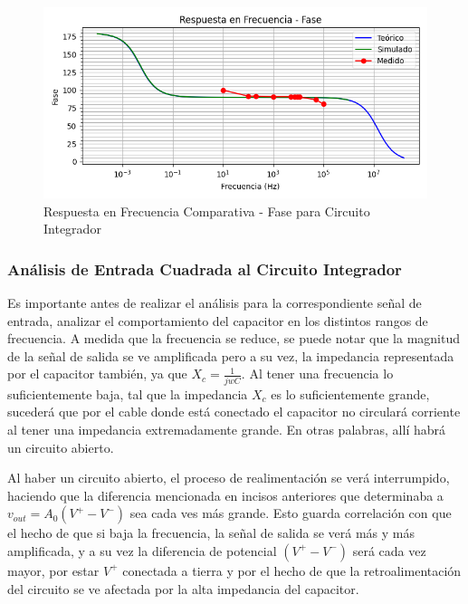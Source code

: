 \begin{figure}[H]
    \centering 
    \includegraphics [scale=1] {../Ejercicio3-CircuitoIntegradoresyDerivadores/Imagenes/comparativo-integrador-fase.png} 
    \caption{Respuesta en Frecuencia Comparativa - Fase para Circuito Integrador}
    \label{fig:emptyPlotTool}
\end{figure}

\subsubsection{Análisis de Entrada Cuadrada al Circuito Integrador}

Es importante antes de realizar el análisis para la correspondiente señal de entrada, analizar el comportamiento del capacitor en los distintos rangos de frecuencia.
A medida que la frecuencia se reduce, se puede notar que la magnitud de la señal de salida se ve amplificada pero a su vez, la impedancia representada por el capacitor
también, ya que $X_c= \frac{1}{jwC}$. Al tener una frecuencia lo suficientemente baja, tal que la impedancia $X_c$ es lo suficientemente grande, sucederá que por el cable 
donde está conectado el capacitor no circulará corriente al tener una impedancia extremadamente grande. En otras palabras, allí habrá un circuito abierto.

Al haber un circuito abierto, el proceso de realimentación se verá interrumpido, haciendo que la diferencia mencionada en incisos anteriores que determinaba a 
$v_{out}=A_0(V^+-V^-)$ sea cada ves más grande. Esto guarda correlación con que el hecho de que si baja la frecuencia, la señal de salida se verá más y más amplificada,
y a su vez la diferencia de potencial $(V^+-V^-)$ será cada vez mayor, por estar $V^+$ conectada a tierra y por el hecho de que la retroalimentación del circuito se ve afectada
por la alta impedancia del capacitor.

